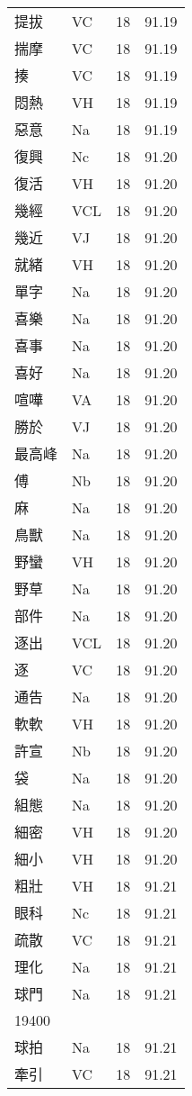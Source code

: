 \documentclass[twocolumn]{book}
\begin{document}
\begin{supertabular}{llrr}
提拔 & VC & 18 &  91.19\\
揣摩 & VC & 18 &  91.19\\
揍 & VC & 18 &  91.19\\
悶熱 & VH & 18 &  91.19\\
惡意 & Na & 18 &  91.19\\
復興 & Nc & 18 &  91.20\\
復活 & VH & 18 &  91.20\\
幾經 & VCL & 18 &  91.20\\
幾近 & VJ & 18 &  91.20\\
就緒 & VH & 18 &  91.20\\
單字 & Na & 18 &  91.20\\
喜樂 & Na & 18 &  91.20\\
喜事 & Na & 18 &  91.20\\
喜好 & Na & 18 &  91.20\\
喧嘩 & VA & 18 &  91.20\\
勝於 & VJ & 18 &  91.20\\
最高峰 & Na & 18 &  91.20\\
傅 & Nb & 18 &  91.20\\
麻 & Na & 18 &  91.20\\
鳥獸 & Na & 18 &  91.20\\
野蠻 & VH & 18 &  91.20\\
野草 & Na & 18 &  91.20\\
部件 & Na & 18 &  91.20\\
逐出 & VCL & 18 &  91.20\\
逐 & VC & 18 &  91.20\\
通告 & Na & 18 &  91.20\\
軟軟 & VH & 18 &  91.20\\
許宣 & Nb & 18 &  91.20\\
袋 & Na & 18 &  91.20\\
組態 & Na & 18 &  91.20\\
細密 & VH & 18 &  91.20\\
細小 & VH & 18 &  91.20\\
粗壯 & VH & 18 &  91.21\\
眼科 & Nc & 18 &  91.21\\
疏散 & VC & 18 &  91.21\\
理化 & Na & 18 &  91.21\\
球門 & Na & 18 &  91.21\\
19400\\
球拍 & Na & 18 &  91.21\\
牽引 & VC & 18 &  91.21\\

\end{supertabular}
\end{document}

